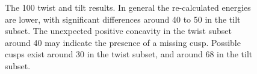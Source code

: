 \documentclass[twoside,senior]{BYUPhys}
\begin{document}
\begin{figure}[ht!]
 \centering
 
 \quad
 \caption[Results for the \textlangle{}100\textrangle{} fitting.]{\label{fig:100} The \textlangle{}100\textrangle{} twist \protect{} and tilt \protect{} results.  In general the re-calculated energies are lower, with significant differences around 40\textdegree{} to 50\textdegree{} in the tilt subset.  The unexpected positive concavity in the twist subset around 40\textdegree{} may indicate the presence of a missing cusp.  Possible cusps exist around 30\textdegree{} in the twist subset, and around 68\textdegree{} in the tilt subset. }
 
\end{figure}
\end{document}

